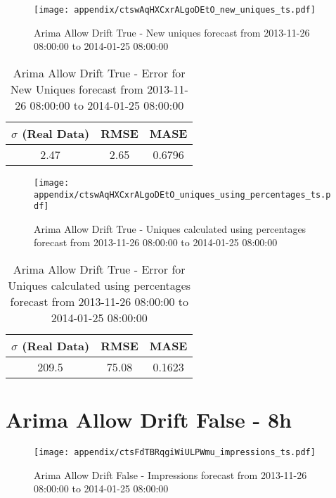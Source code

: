 \begin{figure}[H] \begin{center} \leavevmode
\texttt{[image: appendix/ctswAqHXCxrALgoDEtO\_new\_uniques\_ts.pdf]} \caption{
Arima Allow Drift True - New uniques forecast from 2013-11-26 08:00:00 to 2014-01-25 08:00:00} \label{fig:appendix/ctswAqHXCxrALgoDEtO_new_uniques_ts.pdf} \end{center}
\end{figure}

\begin{table}[H]
\centering
\footnotesize
\begin{tabular}{ccc}
$\sigma$ (Real Data) & RMSE & MASE   \\ \hline
2.47 & 2.65 & 0.6796 \\
\end{tabular}

\vspace{0.5cm}

\caption{
Arima Allow Drift True - Error for New Uniques forecast from 2013-11-26 08:00:00 to 2014-01-25 08:00:00}
\end{table}

\begin{figure}[H] \begin{center} \leavevmode
\texttt{[image: appendix/ctswAqHXCxrALgoDEtO\_uniques\_using\_percentages\_ts.pdf]} \caption{
Arima Allow Drift True - Uniques calculated using percentages forecast from 2013-11-26 08:00:00 to 2014-01-25 08:00:00} \label{fig:appendix/ctswAqHXCxrALgoDEtO_uniques_using_percentages_ts.pdf} \end{center}
\end{figure}

\begin{table}[H]
\centering
\footnotesize
\begin{tabular}{ccc}
$\sigma$ (Real Data) & RMSE & MASE   \\ \hline
209.5 & 75.08 & 0.1623 \\
\end{tabular}

\vspace{0.5cm}

\caption{
Arima Allow Drift True - Error for Uniques calculated using percentages forecast from 2013-11-26 08:00:00 to 2014-01-25 08:00:00}
\end{table}

\section{Arima Allow Drift False - 8h}
\begin{figure}[H] \begin{center} \leavevmode
\texttt{[image: appendix/ctsFdTBRqgiWiULPWmu\_impressions\_ts.pdf]} \caption{
Arima Allow Drift False - Impressions forecast from 2013-11-26 08:00:00 to 2014-01-25 08:00:00} \label{fig:appendix/ctsFdTBRqgiWiULPWmu_impressions_ts.pdf} \end{center}
\end{figure}

